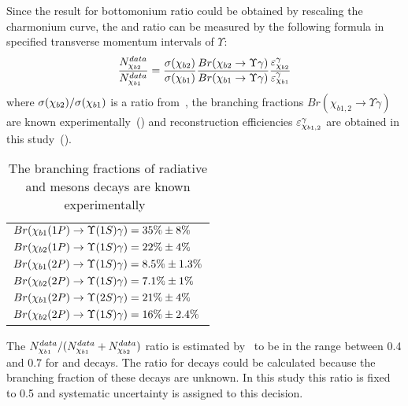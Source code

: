 Since the result for bottomonium ratio could be obtained by rescaling the
charmonium curve, the  \chibone and \chibtwo ratio can be  measured by the
following formula in specified transverse momentum intervals of $\Upsilon$:
\begin{equation}
    \frac{N_{\chi_{{b} 2}}^{data}}{N_{\chi_{{b} 1}}^{data}} = \frac{\sigma(\chi_{{b} 2})}{\sigma(\chi_{{b} 1})}
    \frac{Br(\chi_{{b} 2}\rightarrow\Upsilon\gamma)}{Br(\chi_{{b} 1}\rightarrow\Upsilon\gamma)}\frac{{\varepsilon}_{\chi_{{b} 2}}^{\gamma}}{{\varepsilon}_{\chi_{{b} 1}}^{\gamma}}
\label{eqn:mc_ratio}
\end{equation}
\noindent where $\sigma(\chi_{{b} 2}) / \sigma(\chi_{{b} 1})$ is a ratio
from~\cite{Likhoded:2012hw}, the branching fractions $Br(\chi_{b1,2} \to \Upsilon \gamma)$ 
are known experimentally~() and reconstruction efficiencies 
${\varepsilon}_{\chi_{b1,2}}^{\gamma}$ are obtained in this study~().

\begin{table}[H]
\caption{The branching fractions of radiative \chibOneP and \chibTwoP mesons
decays are known experimentally~\cite{PDG2012}}
\centering
\begin{tabular}{l}
$Br(\chiboneOneP \to \Y1S \gamma) = 35\% \pm 8\%$ \\
$Br(\chibtwoOneP \to \Y1S \gamma) = 22\% \pm 4\%$ \\
$Br(\chiboneTwoP \to \Y1S \gamma) = 8.5\% \pm 1.3\%$ \\
$Br(\chibtwoTwoP \to \Y1S \gamma)  = 7.1\% \pm 1\%$ \\
$Br(\chiboneTwoP \to \Y2S \gamma) = 21\% \pm 4\%$ \\
$Br(\chibtwoTwoP \to \Y1S \gamma) = 16\% \pm 2.4\%$ \\
\end{tabular}
\label{tab:branching}
\end{table}

The $N_{\chi_{{b} 1}}^{data}/(N_{\chi_{{b} 1}}^{data} + N_{\chi_{{b} 2}}^{data})$ ratio is
estimated by~ to be in the range between 0.4 and 0.7 for
\chibOneP and \chibTwoP decays. The ratio for \chibThreeP decays could be
calculated because the branching fraction of these decays are unknown. In this
study this ratio is fixed to 0.5 and systematic uncertainty is assigned to this
decision.


% 
